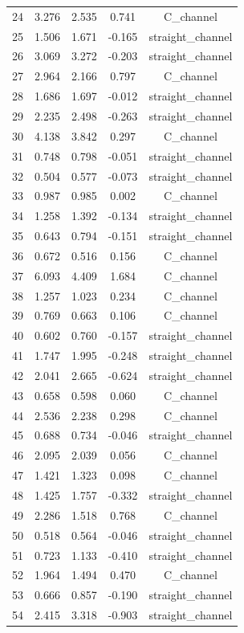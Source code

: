 \begin{longtable}{ccccc}
24 & 3.276 & 2.535 & 0.741 & C_channel \\
25 & 1.506 & 1.671 & -0.165 & straight_channel \\
26 & 3.069 & 3.272 & -0.203 & straight_channel \\
27 & 2.964 & 2.166 & 0.797 & C_channel \\
28 & 1.686 & 1.697 & -0.012 & straight_channel \\
29 & 2.235 & 2.498 & -0.263 & straight_channel \\
30 & 4.138 & 3.842 & 0.297 & C_channel \\
31 & 0.748 & 0.798 & -0.051 & straight_channel \\
32 & 0.504 & 0.577 & -0.073 & straight_channel \\
33 & 0.987 & 0.985 & 0.002 & C_channel \\
34 & 1.258 & 1.392 & -0.134 & straight_channel \\
35 & 0.643 & 0.794 & -0.151 & straight_channel \\
36 & 0.672 & 0.516 & 0.156 & C_channel \\
37 & 6.093 & 4.409 & 1.684 & C_channel \\
38 & 1.257 & 1.023 & 0.234 & C_channel \\
39 & 0.769 & 0.663 & 0.106 & C_channel \\
40 & 0.602 & 0.760 & -0.157 & straight_channel \\
41 & 1.747 & 1.995 & -0.248 & straight_channel \\
42 & 2.041 & 2.665 & -0.624 & straight_channel \\
43 & 0.658 & 0.598 & 0.060 & C_channel \\
44 & 2.536 & 2.238 & 0.298 & C_channel \\
45 & 0.688 & 0.734 & -0.046 & straight_channel \\
46 & 2.095 & 2.039 & 0.056 & C_channel \\
47 & 1.421 & 1.323 & 0.098 & C_channel \\
48 & 1.425 & 1.757 & -0.332 & straight_channel \\
49 & 2.286 & 1.518 & 0.768 & C_channel \\
50 & 0.518 & 0.564 & -0.046 & straight_channel \\
51 & 0.723 & 1.133 & -0.410 & straight_channel \\
52 & 1.964 & 1.494 & 0.470 & C_channel \\
53 & 0.666 & 0.857 & -0.190 & straight_channel \\
54 & 2.415 & 3.318 & -0.903 & straight_channel \\

\end{longtable}
